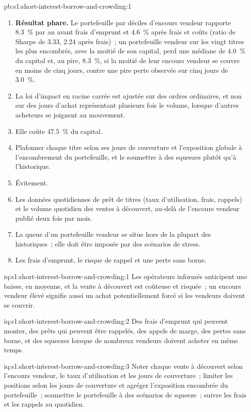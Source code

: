 \begin{solution}{pb:s1:short-interest-borrow-and-crowding:1}
\begin{enumerate}
\item \textbf{Résultat phare.} Le portefeuille par déciles d'encours vendeur rapporte 8.3~\% par an avant frais d'emprunt et 4.6~\% après frais et coûts (ratio de Sharpe de 3.33, 2.24
après frais)~; un portefeuille vendeur sur les vingt titres les plus encombrés, avec la moitié de son capital, perd une médiane de 4.0~\% du capital et, au pire, 8.3~\%, si la moitié de leur encours vendeur
se couvre en moins de cinq jours, contre une pire perte observée sur cinq jours de 3.0~\%.
\item La loi d'impact en racine carrée est ajustée sur des ordres ordinaires, et non sur des jours d'achat représentant plusieurs fois le volume, lorsque d'autres acheteurs se joignent au mouvement.
\item Elle coûte 47.5~\% du capital.
\item Plafonner chaque titre selon ses jours de couverture et l'exposition globale à l'encombrement du portefeuille, et le soumettre à des squeezes plutôt qu'à l'historique.
\item Évitement.
\item Les données quotidiennes de prêt de titres (taux d'utilisation, frais, rappels) et le volume quotidien des ventes à découvert, au-delà de l'encours vendeur publié deux fois par mois.
\item La queue d'un portefeuille vendeur se situe hors de la plupart des historiques~; elle doit être imposée par des scénarios de stress.
\item Les frais d'emprunt, le risque de rappel et une perte sans borne.
\end{enumerate}
\end{solution}

\begin{solution}{iq:s1:short-interest-borrow-and-crowding:1}
Les opérateurs informés anticipent une baisse, en moyenne, et la vente à découvert est coûteuse et risquée~; un encours vendeur élevé signifie aussi un achat potentiellement forcé
si les vendeurs doivent se couvrir.
\end{solution}

\begin{solution}{iq:s1:short-interest-borrow-and-crowding:2}
Des frais d'emprunt qui peuvent monter, des prêts qui peuvent être rappelés, des appels de marge, des pertes sans borne, et des squeezes lorsque de nombreux vendeurs doivent acheter en même temps.
\end{solution}

\begin{solution}{iq:s1:short-interest-borrow-and-crowding:3}
Noter chaque vente à découvert selon l'encours vendeur, le taux d'utilisation et les jours de couverture~; limiter les positions selon les jours de couverture et agréger l'exposition encombrée du portefeuille~; soumettre le portefeuille
à des scénarios de squeeze~; suivre les frais et les rappels au quotidien.
\end{solution}

